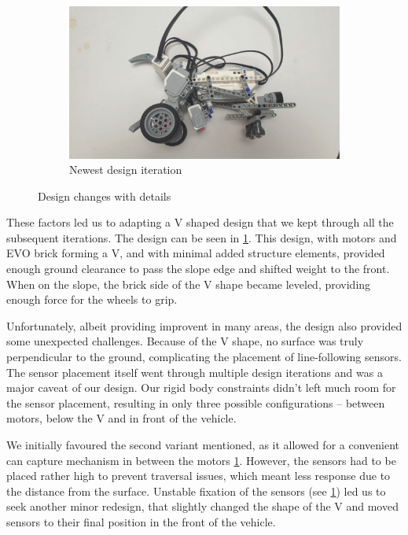 \documentclass{article}
\begin{document}
\begin{figure}[!htbp]
	\vspace{\baselineskip}

	\begin{subfigure}{\textwidth}
		\includegraphics[width=\textwidth]{./figures/new-prototype.jpeg}
		\caption{Newest design iteration}%
	\end{subfigure}

	\caption{Design changes with details}%
    \label{fig:design-changes}%

\end{figure}

\newpage

These factors led us to adapting a V shaped design that we kept through all the subsequent iterations. The design can 
be seen in \ref{fig:design-changes}. This design, with motors and EVO brick forming a V, and with minimal added
structure elements, provided enough ground clearance to pass the slope edge and shifted weight to the front. When on 
the slope, the brick side of the V shape became leveled, providing enough force for the wheels to grip.

Unfortunately, albeit providing improvent in many areas, the design also provided some unexpected challenges.
Because of the V shape, no surface was truly perpendicular to the ground, complicating the placement of line-following
sensors. The sensor placement itself went through multiple design iterations and was a major caveat of our design.
Our rigid body constraints didn't left much room for the sensor placement, resulting in only three possible
configurations -- between motors, below the V and in front of the vehicle.

We initially favoured the second variant mentioned, as it allowed for a convenient can capture mechanism in between
the motors \ref{fig:design-changes}. However, the sensors had to be placed rather high to prevent traversal issues, which meant less
response due to the distance from the surface. Unstable fixation of the sensors (see \ref{fig:design-changes}) led us to seek another
minor redesign, that slightly changed the shape of the V and moved sensors to their final position in the front of the vehicle.
\end{document}
